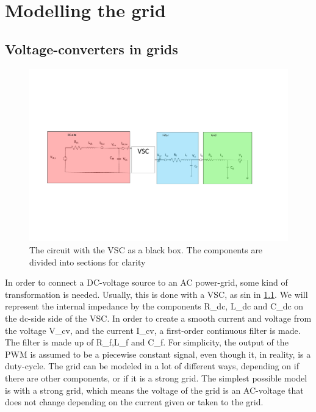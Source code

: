 \chapter{Modelling the grid}
\label{chp:Modeling_the_grid}
\section{Voltage-converters in grids}
\label{sec:VSC}


\begin{figure}[ht!]
 \centering
 \includegraphics[width=\textwidth,height=\textheight,keepaspectratio]{Figures/Sectioned_simplest_transformer.pdf}
 \caption{The circuit with the VSC as a black box. The components are divided into sections for clarity}
 \label{fig:simplest_system}
\end{figure}


In order to connect a DC-voltage source to an AC power-grid, some kind of transformation is needed. Usually, this is done with a \gls{VSC}, as sin in \cref{fig:simplest_system}. We will represent the internal impedance by the components R\gls{_dc}, L\gls{_dc} and C\gls{_dc} on the dc-side side of the \gls{VSC}. In order to create a smooth current and voltage from the voltage \gls{V_cv}, and the current \gls{I_cv}, a first-order continuous filter is made. The filter is made up of R\gls{_f},L\gls{_f} and C\gls{_f}. For simplicity, the output of the \gls{PWM} is assumed to be a piecewise constant signal, even though it, in reality, is a duty-cycle. The grid can be modeled in a lot of different ways, depending on if there are other components, or if it is a strong grid. The simplest possible model is with a strong grid, which means the voltage of the grid is an AC-voltage that does not change depending on the current given or taken to the grid. 

